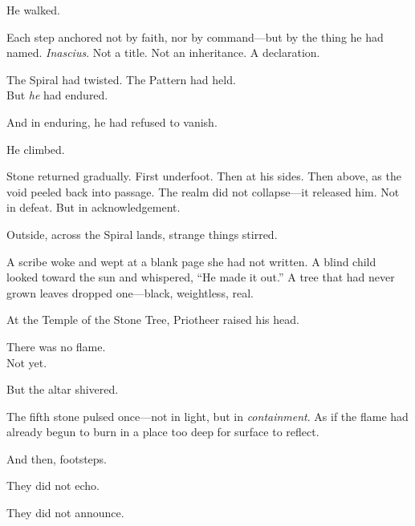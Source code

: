 \documentclass[12pt]{article}
\begin{document}
\vspace{0.5em}
He walked.

\vspace{0.5em}
Each step anchored not by faith, nor by command---but by the thing he had named. \textit{Inascius}. Not a title. Not an inheritance. A declaration.

\vspace{0.5em}
The Spiral had twisted. The Pattern had held.\\
But \textit{he} had endured.

\vspace{0.5em}
And in enduring, he had refused to vanish.

\vspace{0.5em}
He climbed.

\vspace{0.5em}
Stone returned gradually. First underfoot. Then at his sides. Then above, as the void peeled back into passage. The realm did not collapse---it released him. Not in defeat. But in acknowledgement.

\vspace{0.5em}
Outside, across the Spiral lands, strange things stirred.

\vspace{0.5em}
A scribe woke and wept at a blank page she had not written. A blind child looked toward the sun and whispered, ``He made it out.'' A tree that had never grown leaves dropped one---black, weightless, real.

\vspace{0.5em}
At the Temple of the Stone Tree, Priotheer raised his head.

\vspace{0.5em}
There was no flame.\\
Not yet.

\vspace{0.5em}
But the altar shivered.

\vspace{0.5em}
The fifth stone pulsed once---not in light, but in \textit{containment}. As if the flame had already begun to burn in a place too deep for surface to reflect.

\vspace{0.5em}
And then, footsteps.

\vspace{0.5em}
They did not echo.

\vspace{0.5em}
They did not announce.
\end{document}

